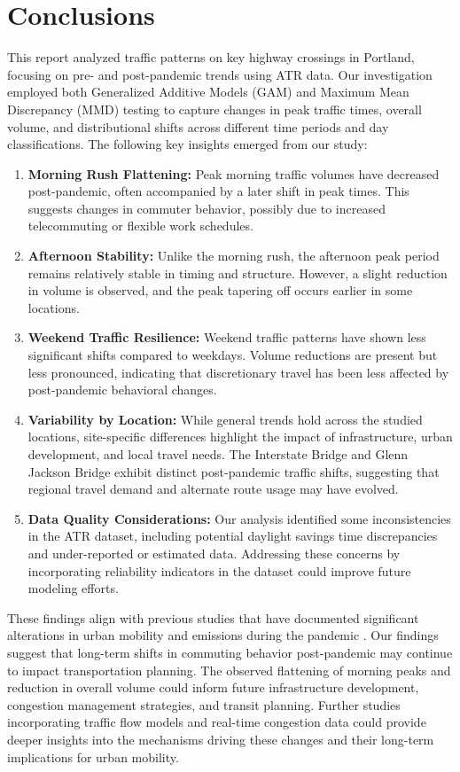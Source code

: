 \documentclass{article}
\begin{document}
\section{Conclusions}

This report analyzed traffic patterns on key highway crossings in Portland, focusing on pre- and post-pandemic trends using ATR data. Our investigation employed both Generalized Additive Models (GAM) and Maximum Mean Discrepancy (MMD) testing to capture changes in peak traffic times, overall volume, and distributional shifts across different time periods and day classifications. The following key insights emerged from our study:

\begin{enumerate}
\item \textbf{Morning Rush Flattening:} Peak morning traffic volumes have decreased post-pandemic, often accompanied by a later shift in peak times. This suggests changes in commuter behavior, possibly due to increased telecommuting or flexible work schedules.
\item \textbf{Afternoon Stability:} Unlike the morning rush, the afternoon peak period remains relatively stable in timing and structure. However, a slight reduction in volume is observed, and the peak tapering off occurs earlier in some locations.
\item \textbf{Weekend Traffic Resilience:} Weekend traffic patterns have shown less significant shifts compared to weekdays. Volume reductions are present but less pronounced, indicating that discretionary travel has been less affected by post-pandemic behavioral changes.
\item \textbf{Variability by Location:} While general trends hold across the studied locations, site-specific differences highlight the impact of infrastructure, urban development, and local travel needs. The Interstate Bridge and Glenn Jackson Bridge exhibit distinct post-pandemic traffic shifts, suggesting that regional travel demand and alternate route usage may have evolved.
\item \textbf{Data Quality Considerations:} Our analysis identified some inconsistencies in the ATR dataset, including potential daylight savings time discrepancies and under-reported or estimated data. Addressing these concerns by incorporating reliability indicators in the dataset could improve future modeling efforts.
\end{enumerate}


These findings align with previous studies that have documented significant alterations in urban mobility and emissions during the pandemic \cite{covid_mobility_emissions}. Our findings suggest that long-term shifts in commuting behavior post-pandemic may continue to impact transportation planning. The observed flattening of morning peaks and reduction in overall volume could inform future infrastructure development, congestion management strategies, and transit planning. Further studies incorporating traffic flow models and real-time congestion data could provide deeper insights into the mechanisms driving these changes and their long-term implications for urban mobility.
\end{document}
